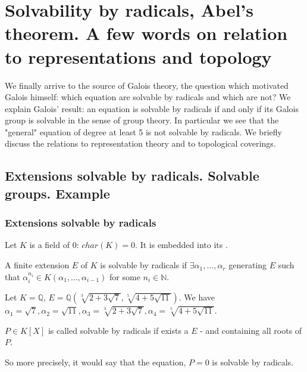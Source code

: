 \chapter{Solvability by radicals, Abel's theorem. A few words on
  relation to representations and topology}

We finally arrive to the source of Galois theory, the question which
motivated Galois himself: which equation are solvable by radicals and
which are not? We explain Galois' result: an equation is solvable by
radicals if and only if its Galois group is solvable in the sense of
group theory. In particular we see that the "general" equation of
degree at least 5 is not solvable by radicals. We briefly discuss the
relations to representation theory and to topological coverings.

\section{Extensions solvable by radicals. Solvable groups. Example} 

\subsection{Extensions solvable by radicals}

Let $K$ is a field of  0: $char(K) = 0$. It is embedded
into its .

\begin{definition}
  A finite extension $E$ of $K$ is solvable by radicals if
  $\exists \alpha_1, \dots, \alpha_r$ generating $E$ such that
  $\alpha_i^{n_i} \in K\left(\alpha_1, \dots, \alpha_{i-1}\right)$ for
  some $n_i \in \mathbb{N}$.
  \label{def:solvableextension}
\end{definition}

\begin{example}
  Let $K = \mathbb{Q}$, $E = \mathbb{Q}\left(\sqrt[3]{2 + 3
    \sqrt{7}}, \sqrt[5]{4 + 5 \sqrt{11}}\right)$. We have
    $\alpha_1 = \sqrt{7}, \alpha_2 = \sqrt{11},
    \alpha_3 = \sqrt[3]{2 + 3\sqrt{7}}, \alpha_4 = \sqrt[5]{4 + 5
      \sqrt{11}}$. 
\end{example}

\begin{definition}
  $P \in K\left[X\right]$ is called solvable by radicals if exists a
  $E$ -  and containing all roots of
  $P$. 
  \label{def:solvablepolynomial}
\end{definition}
So more precisely, it would say that the equation, $P = 0$ is solvable
by radicals.

